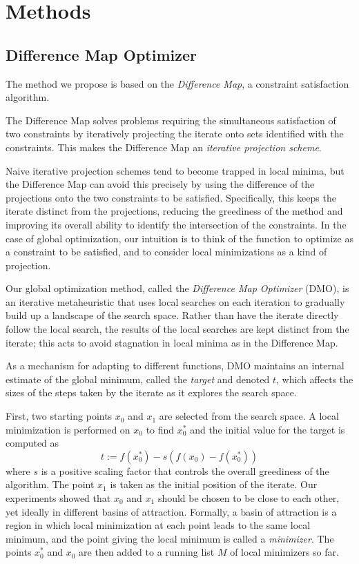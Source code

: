 \documentclass[12pt]{article}
\begin{document}
\section{Methods}

\subsection{Difference Map Optimizer}
The method we propose is based on the \emph{Difference Map}\cite{elser2007}, a
constraint satisfaction algorithm.

The Difference Map solves problems requiring the simultaneous satisfaction of
two constraints by iteratively projecting the iterate onto sets identified with
the constraints.
This makes the Difference Map an \emph{iterative projection scheme}.

Naive iterative projection schemes tend to become trapped in local minima, but
the Difference Map can avoid this precisely by using the difference of the
projections onto the two constraints to be satisfied.
Specifically, this keeps the iterate distinct from the projections,
reducing the greediness of the method and improving its overall ability to
identify the intersection of the constraints.
In the case of global optimization, our intuition is to think
of the function to optimize as a constraint to be satisfied, and to consider
local minimizations as a kind of projection.

Our global optimization method, called the \emph{Difference Map Optimizer}
(DMO), is an iterative metaheuristic that uses local searches on each
iteration to gradually build up a landscape of the search space.
Rather than have the iterate directly follow the local search, the results of
the local searches are kept distinct from the iterate; this acts to avoid
stagnation in local minima as in the Difference Map.

As a mechanism for adapting to different functions, DMO maintains an internal
estimate of the global minimum, called the \emph{target} and denoted $t$,
which affects the sizes of the steps taken by the iterate as it explores the
search space.

First, two starting points $x_0$ and $x_1$ are selected from the search
space.
A local minimization is performed on $x_0$ to find $x_0^*$ and the
initial value for the target is computed as
$$t := f(x_0^*) - s (f(x_0) - f(x_0^*))$$
where $s$ is a positive scaling factor that controls the overall greediness of
the algorithm.
The point $x_1$ is taken as the initial position of the iterate. Our
experiments showed that $x_0$ and $x_1$ should be chosen to be close to
each other, yet ideally in different basins of attraction.
Formally, a basin of attraction is a region in which local minimization at
each point leads to the same local minimum, and the point giving the local
minimum is called a \emph{minimizer}.
The points $x_0^*$ and $x_0$ are then added to a running list $M$ of
local minimizers so far.
\end{document}
